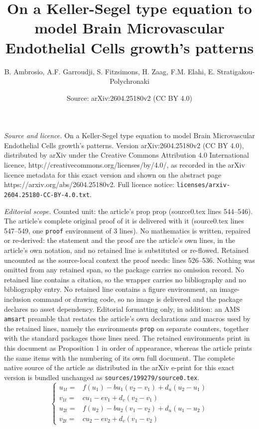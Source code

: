 \documentclass[10pt,a4paper]{amsart}
\title{On a Keller-Segel type equation to model Brain Microvascular Endothelial Cells growth's patterns}
\author{B. Ambrosio, A.F. Garroudji, S. Fitzsimons, H. Zaag, F.M. Elahi, E. Stratigakou-Polychronaki}
\date{Source: arXiv:2604.25180v2 (CC BY 4.0)}
\begin{document}
\maketitle

\noindent\emph{Source and licence.} On a Keller-Segel type equation to model Brain Microvascular Endothelial Cells growth's patterns. Version arXiv:2604.25180v2 (CC BY 4.0), distributed by arXiv under the Creative Commons Attribution 4.0 International licence, http://creativecommons.org/licenses/by/4.0/, as recorded in the arXiv licence metadata for this exact version and shown on the abstract page https://arxiv.org/abs/2604.25180v2. Full licence notice: \texttt{licenses/arxiv-2604.25180-CC-BY-4.0.txt}.\par\smallskip

\noindent\textit{Editorial scope.} Counted unit: the article's prop prop (source0.tex lines 544--546). The article's complete original proof of it is delivered with it (source0.tex lines 547--549, one \texttt{proof} environment of 3 lines). No mathematics is written, repaired or re-derived: the statement and the proof are the article's own lines, in the article's own notation, and no retained line is substituted or re-flowed.  Retained uncounted as the source-local context the proof needs: lines 526--536.  Nothing was omitted from any retained span, so the package carries no omission record.  No retained line contains a citation, so the wrapper carries no bibliography and no bibliography entry.  No retained line contains a figure environment, an image-inclusion command or drawing code, so no image is delivered and the package declares no asset dependency.  Editorial formatting only, in addition: an AMS \texttt{amsart} preamble that restates the article's own declarations and macros used by the retained lines, namely the environments \texttt{prop} on separate counters, together with the standard packages those lines need.  The retained environments print in this document as Proposition 1 in order of appearance, whereas the article prints the same items with the numbering of its own full document.  The complete native source of the article as distributed in the arXiv e-print for this exact version is bundled unchanged as \texttt{sources/199279/source0.tex}.
\begin{equation}
\label{eq:2times2}
\left \{
\begin{array}{rl}
      u_{1t}=&  f(u_1)-bu_1(v_2-v_1)+d_u(u_2-u_1) \\
      v_{1t}=& cu_1-ev_1+d_v(v_2-v_1)\\
         u_{2t}=&  f(u_2)-bu_2(v_1-v_2)+d_u(u_1-u_2) \\
      v_{2t}=& cu_2-ev_2+d_v(v_1-v_2)
 \end{array}
 \right.
\end{equation}
\end{document}
